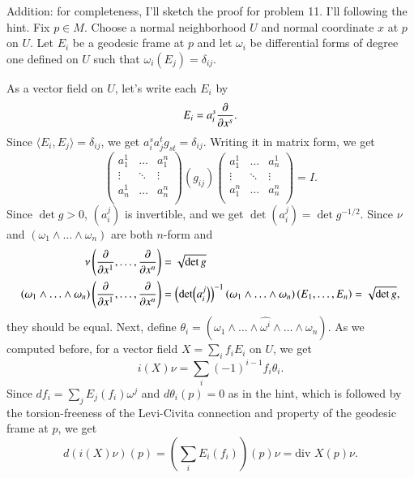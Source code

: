 \documentclass[a4paper, 12pt]{article}
\theoremstyle{Mydefinition}
\theoremstyle{Mytheorem}
\begin{document}
\begin{enumerate}
    Addition: for completeness, I'll sketch the proof for problem 11. I'll following the hint. Fix $p\in M$. Choose a normal neighborhood $U$ and normal coordinate $x$ at $p$ on $U$. Let $E_i$ be a geodesic frame at $p$ and let $\omega_i$ be differential forms of degree one defined on $U$ such that $\omega_i(E_j)=\delta_{ij}$.
    
    As a vector field on $U$, let's write each $E_i$ by
    \begin{equation}
        E_i = a_i^s\pdv{x^s}.
    \end{equation}
    Since $\langle E_i, E_j\rangle = \delta_{ij}$, we get $a_i^s a_j^t g_{st} = \delta_{ij}$. Writing it in matrix form, we get
    \begin{equation}
        \begin{pmatrix}
        a_1^1 & \hdots & a_1^n \\
        \vdots & \ddots & \vdots \\
        a_n^1 & \hdots & a_n^n \\
        \end{pmatrix}
        (g_{ij})
        \begin{pmatrix}
        a_1^1 & \hdots & a_n^1 \\
        \vdots & \ddots & \vdots \\
        a_1^n & \hdots & a_n^n \\
        \end{pmatrix}
        = I.
    \end{equation}
    Since $\det g> 0$, $(a^j_i)$ is invertible, and we get $\det (a^j_i) = \det g^{-1/2}$. Since $\nu$ and $(\omega_1\wedge \ldots \wedge \omega_n)$ are both $n$-form and
    \begin{equation}
    \begin{split}
        \nu\left(\pdv{x^1}, \ldots, \pdv{x^n}\right) &= \sqrt{\det g}\\
        (\omega_1\wedge \ldots \wedge \omega_n)\left(\pdv{x^1}, \ldots, \pdv{x^n}\right) &= \left(\det (a^j_i)\right)^{-1}(\omega_1\wedge \ldots \wedge \omega_n)\left(E_1, \ldots, E_n\right) = \sqrt{\det g},
    \end{split}
    \end{equation}
    they should be equal. Next, define $\theta_i = (\omega_1\wedge \ldots \wedge \widehat{\omega^i}\wedge \ldots \wedge \omega_n)$. As we computed before, for a vector field $X = \sum_{i} f_i E_i$ on $U$, we get
    \begin{equation}
        i(X)\nu = \sum_{i} (-1)^{i-1}f_i\theta_i.
    \end{equation}
    Since $df_i = \sum_{j} E_j(f_i)\omega^j$ and $d\theta_i(p) = 0$ as in the hint, which is followed by the torsion-freeness of the Levi-Civita connection and property of the geodesic frame at $p$, we get
    \begin{equation}
        d(i(X)\nu)(p) = (\sum_{i}E_i(f_i))(p)\nu = \textrm{div }X(p)\nu.
    \end{equation}
\end{enumerate}
\end{document}
